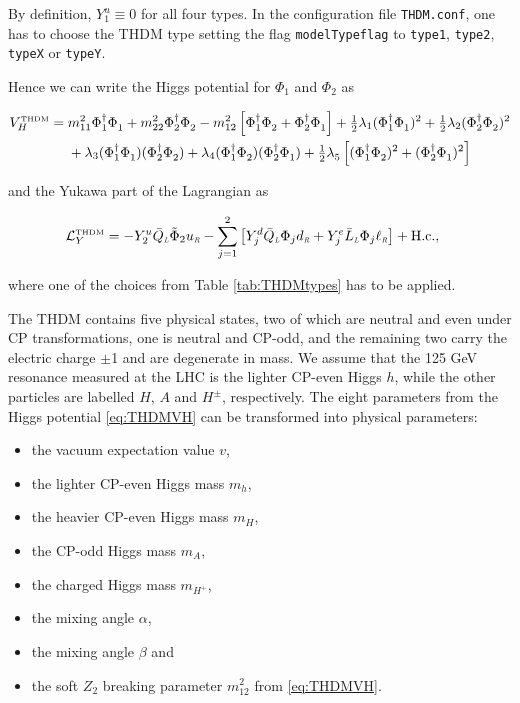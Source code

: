 \documentclass[preprint,3p,12pt]{elsarticle}
\begin{document}
By definition, $Y_1^u \equiv 0$ for all four types. In the configuration file \texttt{THDM.conf}, one has to choose the THDM type setting the flag \texttt{modelTypeflag} to \texttt{type1}, \texttt{type2}, \texttt{typeX} or \texttt{typeY}.

Hence we can write the Higgs potential for $\Phi_1$ and $\Phi_2$ as

\begin{align}
V_H^\text{\tiny{THDM}} & = m_{11}^2\Phi_1^\dagger\Phi_1^{\phantom{\dagger}}
 	+m_{22}^2\Phi_2^\dagger\Phi_2^{\phantom{\dagger}}
 	-m_{12}^2\left[ \Phi_1^\dagger\Phi_2^{\phantom{\dagger}}
 		+\Phi_2^\dagger\Phi_1^{\phantom{\dagger}}\right] 
	+\tfrac12 \lambda_1(\Phi_1^\dagger\Phi_1^{\phantom{\dagger}})^2 
	+\tfrac12 \lambda_2(\Phi_2^\dagger\Phi_2^{\phantom{\dagger}})^2 \nonumber \\
&\phantom{{}={}}
 	+\lambda_3(\Phi_1^\dagger\Phi_1^{\phantom{\dagger}})
 		(\Phi_2^\dagger\Phi_2^{\phantom{\dagger}})
 	+\lambda_4(\Phi_1^\dagger\Phi_2^{\phantom{\dagger}})
 		(\Phi_2^\dagger\Phi_1^{\phantom{\dagger}})
	+\tfrac12 \lambda_5^{} \left[ (\Phi_1^\dagger\Phi_2^{\phantom{\dagger}})^2
 		+(\Phi_2^\dagger\Phi_1^{\phantom{\dagger}})^2 \right] \label{eq:THDMVH}
\end{align}
 
and the Yukawa part of the Lagrangian as
 
\begin{align}
{\cal L}_Y^\text{\tiny{THDM}} &= -Y^u_2 \bar Q_{\textit{\tiny{L}}} \tilde\Phi_2 u_{\textit{\tiny{R}}} -\sum\limits_{j=1}^2 \left[ Y^d_j \bar Q_{\textit{\tiny{L}}} \Phi_j d_{\textit{\tiny{R}}} +Y^e_j \bar L_{\textit{\tiny{L}}} \Phi_j \ell_{\textit{\tiny{R}}}\right] + {\text{H.c.}} \nonumber ,
\end{align}
 
where one of the choices from Table \ref{tab:THDMtypes} has to be applied.

The THDM contains five physical states, two of which are neutral and even under CP transformations, one is neutral and CP-odd, and the remaining two carry the electric charge $\pm$1 and are degenerate in mass. We assume that the 125 GeV resonance measured at the LHC is the lighter CP-even Higgs $h$, while the other particles are labelled $H$, $A$ and $H^\pm$, respectively.
The eight parameters from the Higgs potential \eqref{eq:THDMVH} can be transformed into physical parameters:

\begin{itemize}
\item the vacuum expectation value $v$,
\item the lighter CP-even Higgs mass $m_h$,
\item the heavier CP-even Higgs mass $m_H$,
\item the CP-odd Higgs mass $m_A$,
\item the charged Higgs mass $m_{H^+}$,
\item the mixing angle $\alpha$,
\item the mixing angle $\beta$ and
\item the soft $Z_2$ breaking parameter $m_{12}^2$ from \eqref{eq:THDMVH}.
\end{itemize}
\end{document}
